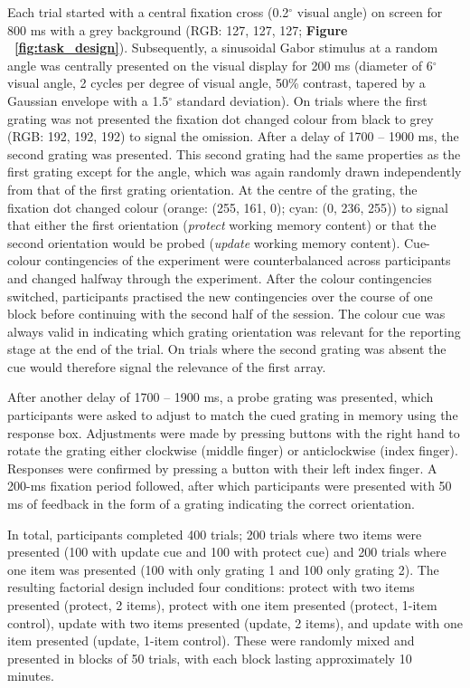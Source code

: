 \documentclass{article}
\begin{document}
\begin{normalsize}
Each trial started with a central fixation cross (0.2$^{\circ}$ visual angle) on screen for 800 ms with a grey background (RGB: 127, 127, 127; \textbf{Figure ~\ref{fig:task_design}}). Subsequently, a sinusoidal Gabor stimulus at a random angle was centrally presented on the visual display for 200 ms (diameter of 6$^{\circ}$ visual angle, 2 cycles per degree of visual angle, 50\% contrast, tapered by a Gaussian envelope with a 1.5$^{\circ}$ standard deviation). On trials where the first grating was not presented the fixation dot changed colour from black to grey (RGB: 192, 192, 192) to signal the omission. After a delay of 1700 – 1900 ms, the second grating was presented. This second grating had the same properties as the first grating except for the angle, which was again randomly drawn independently from that of the first grating orientation. At the centre of the grating, the fixation dot changed colour (orange: (255, 161, 0); cyan: (0, 236, 255)) to signal that either the first orientation (\textit{protect} working memory content) or that the second orientation would be probed (\textit{update} working memory content). Cue-colour contingencies of the experiment were counterbalanced across participants and changed halfway through the experiment. After the colour contingencies switched, participants practised the new contingencies over the course of one block before continuing with the second half of the session. The colour cue was always valid in indicating which grating orientation was relevant for the reporting stage at the end of the trial. On trials where the second grating was absent the cue would therefore signal the relevance of the first array. 

After another delay of 1700 – 1900 ms, a probe grating was presented, which participants were asked to adjust to match the cued grating in memory using the response box. Adjustments were made by pressing buttons with the right hand to rotate the grating either clockwise (middle finger) or anticlockwise (index finger). Responses were confirmed by pressing a button with their left index finger. A 200-ms fixation period followed, after which participants were presented with 50 ms of feedback in the form of a grating indicating the correct orientation.

In total, participants completed 400 trials; 200 trials where two items were presented (100 with update cue and 100 with protect cue) and 200 trials where one item was presented (100 with only grating 1 and 100 only grating 2). The resulting factorial design included four conditions: protect with two items presented (protect, 2 items), protect with one item presented (protect, 1-item control), update with two items presented (update, 2 items), and update with one item presented (update, 1-item control). These were randomly mixed and presented in blocks of 50 trials, with each block lasting approximately 10 minutes.\\



\end{normalsize}
\end{document}

